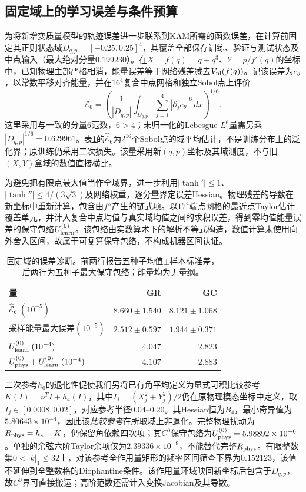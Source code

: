 \subsection{固定域上的学习误差与条件预算}

为将新增变质量模型的轨迹误差进一步联系到KAM所需的函数误差，在计算前固定其正则状态域$D_{q,p}=[-0.25,0.25]^4$，其覆盖全部保存训练、验证与测试状态及中点输入（最大绝对分量$0.199230$）。在$X=f(q)=q+q^3$、$Y=p/f'(q)$的坐标中，已知物理主部严格相消，能量误差等于网络残差减去$V_{\rm nl}(f(q))$。记该误差为$e_\theta$，以常数平移对齐能量，并在$16^4$复合中点网格和独立Sobol点上评价
\[
 \mathcal E_6=\left(\frac1{|D_{q,p}|}\int_{D_{q,p}}
       \sum_{j=1}^4|\partial_j e_\theta|^6\,dx\right)^{1/6}.
\]
这里采用与\citet[式(8)]{Chen2022}一致的分量$6$范数，$6>4$；未归一化的Lebesgue $L^6$量需另乘$|D_{q,p}|^{1/6}=0.629961$。表\ref{tab:kam_error_bridge}的$\widehat{\mathcal E}_6$为$2^{16}$个Sobol点的域平均估计，不是训练分布上的泛化界；原训练仍采用二次损失。该量采用新$(q,p)$坐标及其域测度，不与旧$(X,Y)$盒域的数值直接横比。

为避免把有限点最大值当作全域界，进一步利用$|\tanh'|\leq1$、$|\tanh''|\leq4/(3\sqrt3)$及网络权重，逐分量界定误差Hessian。物理残差的导数在新坐标中重新计算，包含由$f''$产生的链式项。以$17^4$端点网格的最近点Taylor估计覆盖单元，并计入复合中点均值与真实域均值之间的求积误差，得到零均值能量误差的保守包络$U_{\rm learn}^{(0)}$。该包络由实数算术下的解析不等式构造，数值计算未使用向外舍入区间，故属于可复算保守包络，不构成机器区间认证。

\begin{table}[t]
\centering\small\setlength{\tabcolsep}{5pt}
\caption{固定域的误差诊断。前两行报告五种子均值$\pm$样本标准差，后两行为五种子最大保守包络；能量均为无量纲。}
\label{tab:kam_error_bridge}
\begin{tabular}{lrr}
\toprule
量 & GR & GC\\
\midrule
$\widehat{\mathcal E}_6\;(10^{-5})$ & $8.660\pm1.540$ & $8.121\pm1.068$\\
采样能量最大误差$(10^{-5})$ & $2.512\pm0.597$ & $1.944\pm0.371$\\
$U_{\rm learn}^{(0)}\;(10^{-4})$ & $4.047$ & $2.823$\\
$U_{\rm phys}^{(0)}+U_{\rm learn}^{(0)}\;(10^{-4})$ & $4.107$ & $2.883$\\
\bottomrule
\end{tabular}
\end{table}

二次参考$h_0$的退化性促使我们另将已有角平均定义为显式可积比较参考$K(I)=\nu^TI+\overline h_4(I)$，其中$I_j=(X_j^2+Y_j^2)/2$仍在原物理模态坐标中定义，取$I_j\in[0.0008,0.02]$，对应参考半径$0.04$--$0.20$。其Hessian恒为$B_4$，最小奇异值为$5.80643\times10^{-4}$，因此该\emph{比较参考}在所取域上非退化。完整物理扰动为$R_{\rm phys}=h_*-K$，仍保留角依赖四次项；其$C^0$保守包络为$U_{\rm phys}^{(0)}=5.98892\times10^{-6}$。单独的余弦六阶Taylor余项仅为$2.39336\times10^{-9}$，不能替代完整$R_{\rm phys}$。有限整数集$0<|k|_1\leq32$上，对该参考全作用量矩形的频率区间筛查下界为$0.152123$，该值不延伸到全整数格的Diophantine条件。该作用量环域映回新坐标后包含于$D_{q,p}$，故$C^0$界可直接搬运；高阶范数还需计入变换Jacobian及其导数。

